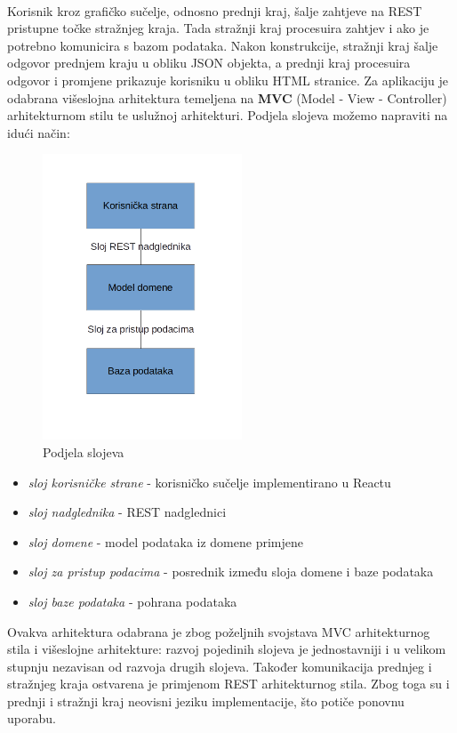 	\\
	Korisnik kroz grafičko sučelje, odnosno prednji kraj, šalje zahtjeve na REST pristupne točke stražnjeg kraja. Tada stražnji kraj procesuira zahtjev i ako je potrebno komunicira s bazom podataka. Nakon konstrukcije, stražnji kraj šalje odgovor prednjem kraju u obliku JSON objekta, a prednji kraj procesuira odgovor i promjene prikazuje korisniku u obliku HTML stranice.
	Za aplikaciju je odabrana višeslojna arhitektura temeljena na \textbf{MVC} (Model - View - Controller) arhitekturnom stilu te uslužnoj arhitekturi. Podjela slojeva možemo napraviti na idući način:
	\begin{figure}[H]
			\centering
			\includegraphics[scale=0.9]{slike/arhitektura2.png}
			\caption{Podjela slojeva}
			\label{fig:slojevi}
		\end{figure}
	\begin{itemize}
\eject
		\item 	\textit{sloj korisničke strane} - korisničko sučelje implementirano u Reactu
		\item 	\textit{sloj nadglednika} - REST nadglednici
		\item 	\textit{sloj domene}	- model podataka iz domene primjene
		\item 	\textit{sloj za pristup podacima} - posrednik između sloja domene i baze podataka
		\item 	\textit{sloj baze podataka} - pohrana podataka	
		\end{itemize}
	{Ovakva arhitektura odabrana je zbog poželjnih svojstava MVC arhitekturnog stila i višeslojne arhitekture: razvoj pojedinih slojeva je jednostavniji i u velikom stupnju nezavisan od razvoja drugih slojeva. Također komunikacija prednjeg i stražnjeg kraja ostvarena je primjenom REST arhitekturnog stila. Zbog toga su i prednji i stražnji kraj neovisni jeziku implementacije, što potiče ponovnu uporabu. }
	
